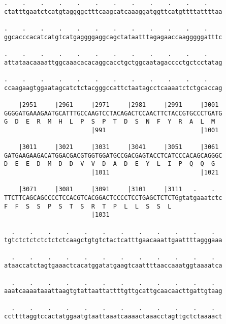 \documentclass{article}
\begin{document}
\begin{Verbatim}
.    .    .    .    .    .    .    .    .    .    .    .    
ctatttgaatctcatgtaggggctttcaagcatcaaaggatggttcatgttttattttaa
                                                            
.    .    .    .    .    .    .    .    .    .    .    .    
ggcacccacatcatgtcatgaggggaggcagctataatttagagaaccaagggggatttc
                                                            
.    .    .    .    .    .    .    .    .    .    .    .    
attataacaaaattggcaaacacacaggcacctgctggcaatagacccctgctcctatag
                                                            
.    .    .    .    .    .    .    .    .    .    .    .    
ccaagaagtggaatagcatctctacgggccattctaatagcctcaaaatctctgcaccag
                                                            
    |2951     |2961     |2971     |2981     |2991     |3001 
GGGGATGAAAGAATGCATTTGCCAAGTCCTACAGACTCCAACTTCTACCGTGCCCTGATG
G  D  E  R  M  H  L  P  S  P  T  D  S  N  F  Y  R  A  L  M  
                        |991                          |1001 
  
    |3011     |3021     |3031     |3041     |3051     |3061 
GATGAAGAAGACATGGACGACGTGGTGGATGCCGACGAGTACCTCATCCCACAGCAGGGC
D  E  E  D  M  D  D  V  V  D  A  D  E  Y  L  I  P  Q  Q  G  
                        |1011                         |1021 
  
    |3071     |3081     |3091     |3101     |3111   .    .  
TTCTTCAGCAGCCCCTCCACGTCACGGACTCCCCTCCTGAGCTCTCTGgtatgaaatctc
F  F  S  S  P  S  T  S  R  T  P  L  L  S  S  L              
                        |1031                               
  
  .    .    .    .    .    .    .    .    .    .    .    .  
tgtctctctctctctctcaagctgtgtctactcatttgaacaaattgaattttagggaaa
                                                            
  .    .    .    .    .    .    .    .    .    .    .    .  
ataaccatctagtgaaactcacatggatatgaagtcaattttaaccaaatggtaaaatca
                                                            
  .    .    .    .    .    .    .    .    .    .    .    .  
aaatcaaaataaattaagtgtattaattattttgttgcattgcaacaacttgattgtaag
                                                            
  .    .    .    .    .    .    .    .    .    .    .    .  
ccttttaggtccactatggaatgtaattaaatcaaaactaaacctagttgctctaaaact
                                                            

\end{Verbatim}
\end{document}
